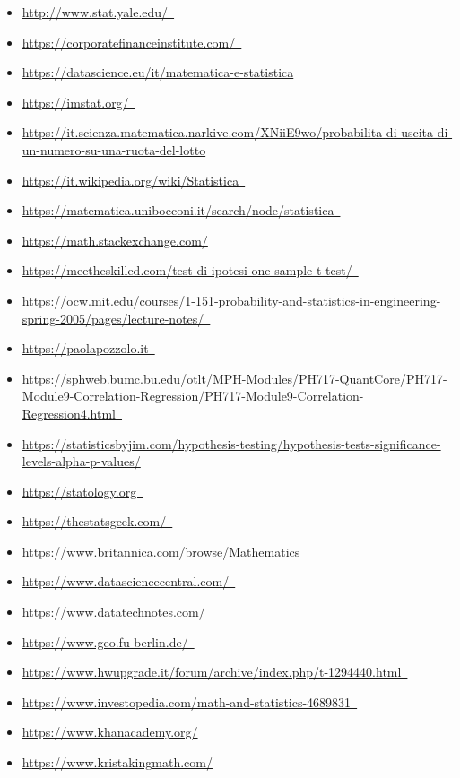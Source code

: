 \documentclass{article}
\begin{document}
\begin{sloppypar}
\begin{itemize}
    \item \url{http://www.stat.yale.edu/ }
    \item \url{https://corporatefinanceinstitute.com/ } 
    \item \url{https://datascience.eu/it/matematica-e-statistica }
    \item \url{https://imstat.org/ }
    \item \url{https://it.scienza.matematica.narkive.com/XNiiE9wo/probabilita-di-uscita-di-un-numero-su-una-ruota-del-lotto}
    \item \url{https://it.wikipedia.org/wiki/Statistica }
    \item \url{https://matematica.unibocconi.it/search/node/statistica }
    \item \url{https://math.stackexchange.com/}
    \item \url{https://meetheskilled.com/test-di-ipotesi-one-sample-t-test/ }
    \item \url{https://ocw.mit.edu/courses/1-151-probability-and-statistics-in-engineering-spring-2005/pages/lecture-notes/ }
    \item \url{https://paolapozzolo.it }
    \item \url{https://sphweb.bumc.bu.edu/otlt/MPH-Modules/PH717-QuantCore/PH717-Module9-Correlation-Regression/PH717-Module9-Correlation-Regression4.html }
    \item \url{https://statisticsbyjim.com/hypothesis-testing/hypothesis-tests-significance-levels-alpha-p-values/}
    \item \url{https://statology.org }
    \item \url{https://thestatsgeek.com/ }
    \item \url{https://www.britannica.com/browse/Mathematics }
    \item \url{https://www.datasciencecentral.com/ }
    \item \url{https://www.datatechnotes.com/ }
    \item \url{https://www.geo.fu-berlin.de/ }
    \item \url{https://www.hwupgrade.it/forum/archive/index.php/t-1294440.html }
    \item \url{https://www.investopedia.com/math-and-statistics-4689831 }
    \item \url{https://www.khanacademy.org/}
    \item \url{https://www.kristakingmath.com/}

\end{itemize}
\end{sloppypar}
\end{document}
